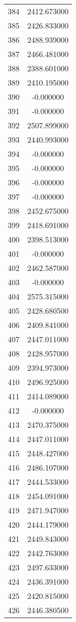 \documentclass[12pt]{article}
\begin{document}
\begin{longtable}{@{}cc@{}}
384 & 2412.673000 \\
385 & 2426.833000 \\
386 & 2488.939000 \\
387 & 2466.481000 \\
388 & 2388.601000 \\
389 & 2410.195000 \\
390 & -0.000000 \\
391 & -0.000000 \\
392 & 2507.899000 \\
393 & 2440.993000 \\
394 & -0.000000 \\
395 & -0.000000 \\
396 & -0.000000 \\
397 & -0.000000 \\
398 & 2452.675000 \\
399 & 2418.691000 \\
400 & 2398.513000 \\
401 & -0.000000 \\
402 & 2462.587000 \\
403 & -0.000000 \\
404 & 2575.315000 \\
405 & 2428.680500 \\
406 & 2409.841000 \\
407 & 2447.011000 \\
408 & 2428.957000 \\
409 & 2394.973000 \\
410 & 2496.925000 \\
411 & 2414.089000 \\
412 & -0.000000 \\
413 & 2470.375000 \\
414 & 2447.011000 \\
415 & 2448.427000 \\
416 & 2486.107000 \\
417 & 2444.533000 \\
418 & 2454.091000 \\
419 & 2471.947000 \\
420 & 2444.179000 \\
421 & 2449.843000 \\
422 & 2442.763000 \\
423 & 2497.633000 \\
424 & 2436.391000 \\
425 & 2420.815000 \\
426 & 2446.380500 \\

\end{longtable}
\end{document}
